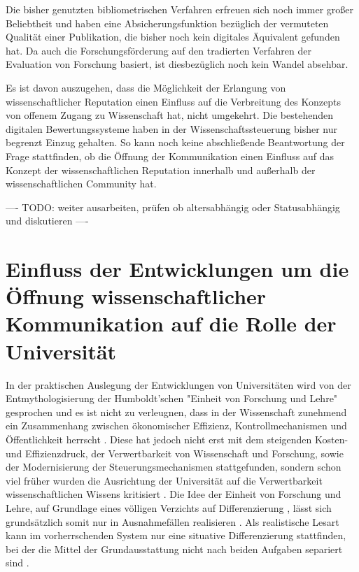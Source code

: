 Die bisher genutzten bibliometrischen Verfahren erfreuen sich noch immer großer Beliebtheit und haben eine Absicherungsfunktion bezüglich der vermuteten Qualität einer Publikation, die bisher noch kein digitales Äquivalent gefunden hat. Da auch die Forschungsförderung auf den tradierten Verfahren der Evaluation von Forschung basiert, ist diesbezüglich noch kein Wandel absehbar.

Es ist davon auszugehen, dass die Möglichkeit der Erlangung von wissenschaftlicher Reputation einen Einfluss auf die Verbreitung des Konzepts von offenem Zugang zu Wissenschaft hat, nicht umgekehrt. Die bestehenden digitalen Bewertungssysteme haben in der Wissenschaftssteuerung bisher nur begrenzt Einzug gehalten. So kann noch keine abschließende Beantwortung der Frage stattfinden, ob die Öffnung der Kommunikation einen Einfluss auf das Konzept der wissenschaftlichen Reputation innerhalb und außerhalb der wissenschaftlichen Community hat.

---- TODO: weiter ausarbeiten, prüfen ob altersabhängig oder Statusabhängig und diskutieren ----

\section{Einfluss der Entwicklungen um die Öffnung wissenschaftlicher Kommunikation auf die Rolle der Universität}

In der praktischen Auslegung der Entwicklungen von Universitäten wird von der Entmythologisierung der Humboldt’schen "Einheit von Forschung und Lehre" gesprochen \cite{binswanger_2014_excellence} \cite[:299]{Schimank_2001} \cite[:343]{Kruecken_2001} und es ist nicht zu verleugnen, dass in der Wissenschaft zunehmend ein Zusammenhang zwischen ökonomischer Effizienz, Kontrollmechanismen und Öffentlichkeit herrscht \cite[:27]{Reinhart_intransparenz_2006} \cite{foucault_1977_uberwachen}. Diese hat jedoch nicht erst mit dem steigenden Kosten- und Effizienzdruck, der Verwertbarkeit von Wissenschaft und Forschung, sowie der Modernisierung der Steuerungsmechanismen stattgefunden, sondern schon viel früher wurden die Ausrichtung der Universität auf die Verwertbarkeit wissenschaftlichen Wissens kritisiert \cite{Huber_2005}. Die Idee der Einheit von Forschung und Lehre, auf Grundlage eines völligen Verzichts auf Differenzierung \cite{kittler_2004}, lässt sich grundsätzlich somit nur in Ausnahmefällen realisieren \cite{Schimank_2001}. Als realistische Lesart kann im vorherrschenden System nur eine situative Differenzierung stattfinden, bei der die Mittel der Grundausstattung nicht nach beiden Aufgaben separiert sind \cite{Schimank_2001}.

